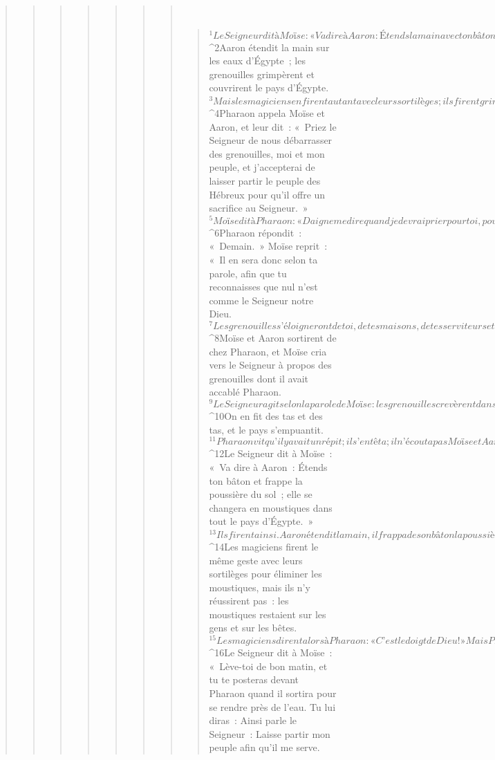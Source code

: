 \begin{verse}
\begin{verse}
\begin{verse}
\begin{verse}
\begin{verse}
\begin{verse}
\begin{verse}
         
      \bchapter{}
      \begin{verse}
${}^{1}Le Seigneur dit à Moïse : « Va dire à Aaron : Étends la main avec ton bâton sur les rivières, les canaux, les étangs, et fais grimper les grenouilles sur le pays d’Égypte. » 
${}^{2}Aaron étendit la main sur les eaux d’Égypte ; les grenouilles grimpèrent et couvrirent le pays d’Égypte. 
${}^{3}Mais les magiciens en firent autant avec leurs sortilèges ; ils firent grimper, eux aussi, des grenouilles sur le pays d’Égypte.
${}^{4}Pharaon appela Moïse et Aaron, et leur dit : « Priez le Seigneur de nous débarrasser des grenouilles, moi et mon peuple, et j’accepterai de laisser partir le peuple des Hébreux pour qu’il offre un sacrifice au Seigneur. » 
${}^{5}Moïse dit à Pharaon : « Daigne me dire quand je devrai prier pour toi, pour tes serviteurs et pour ton peuple, afin que les grenouilles disparaissent de chez toi et de toutes les maisons, et qu’il n’en reste plus, sinon dans le Nil. » 
${}^{6}Pharaon répondit : « Demain. » Moïse reprit : « Il en sera donc selon ta parole, afin que tu reconnaisses que nul n’est comme le Seigneur notre Dieu. 
${}^{7}Les grenouilles s’éloigneront de toi, de tes maisons, de tes serviteurs et de ton peuple ; il n’en restera plus, sinon dans le Nil. »
${}^{8}Moïse et Aaron sortirent de chez Pharaon, et Moïse cria vers le Seigneur à propos des grenouilles dont il avait accablé Pharaon. 
${}^{9}Le Seigneur agit selon la parole de Moïse : les grenouilles crevèrent dans les maisons, dans les cours, dans les champs. 
${}^{10}On en fit des tas et des tas, et le pays s’empuantit. 
${}^{11}Pharaon vit qu’il y avait un répit ; il s’entêta ; il n’écouta pas Moïse et Aaron, ainsi que l’avait annoncé le Seigneur.
${}^{12}Le Seigneur dit à Moïse : « Va dire à Aaron : Étends ton bâton et frappe la poussière du sol ; elle se changera en moustiques dans tout le pays d’Égypte. » 
${}^{13}Ils firent ainsi. Aaron étendit la main, il frappa de son bâton la poussière du sol, et les moustiques s’abattirent sur les gens et sur les bêtes ; toute la poussière du sol se changea en moustiques dans tout le pays d’Égypte. 
${}^{14}Les magiciens firent le même geste avec leurs sortilèges pour éliminer les moustiques, mais ils n’y réussirent pas : les moustiques restaient sur les gens et sur les bêtes. 
${}^{15}Les magiciens dirent alors à Pharaon : « C’est le doigt de Dieu ! » Mais Pharaon s’obstina ; il n’écouta pas Moïse et Aaron, ainsi que l’avait annoncé le Seigneur.
${}^{16}Le Seigneur dit à Moïse : « Lève-toi de bon matin, et tu te posteras devant Pharaon quand il sortira pour se rendre près de l’eau. Tu lui diras : Ainsi parle le Seigneur : Laisse partir mon peuple afin qu’il me serve. 

\end{verse}
\end{verse}
\end{verse}
\end{verse}
\end{verse}
\end{verse}
\end{verse}
\end{verse}
